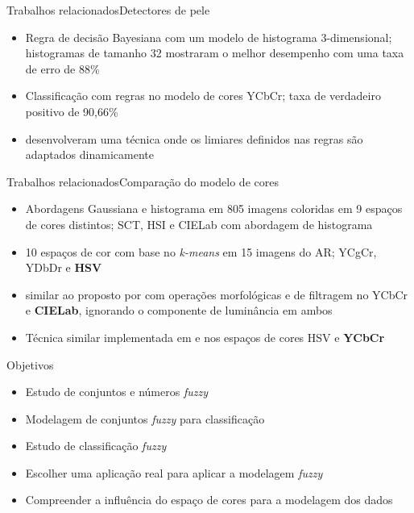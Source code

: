 \begin{frame}{Trabalhos relacionados}{Detectores de pele}
\begin{itemize}
    \item Regra de decisão Bayesiana com um modelo de histograma $3$-dimensional; histogramas de tamanho 32 mostraram o melhor desempenho com uma taxa de erro de 88\% \citep{jones:02}
    \item Classificação com regras no modelo de cores YCbCr; taxa de verdadeiro positivo de 90,66\% \citep{kovac:03}
    \item \citet{yogarajah:11} desenvolveram uma técnica onde os limiares definidos nas regras são adaptados dinamicamente
\end{itemize}
\end{frame}

\begin{frame}{Trabalhos relacionados}{Comparação do modelo de cores}
\begin{itemize}
    \item Abordagens Gaussiana e histograma em 805 imagens coloridas em 9 espaços de cores distintos; SCT, HSI e CIELab com abordagem de histograma \citep{jayaram:04}
    \item 10 espaços de cor com base no \emph{k-means} em 15 imagens do AR; YCgCr, YDbDr e \textbf{HSV} \citep{chaves:10}
    \item \citet{kaur:12} similar ao proposto por \citet{kovac:03} com operações morfológicas e de filtragem no YCbCr e \textbf{CIELab}, ignorando o componente de luminância em ambos
    \item Técnica similar implementada em \citet{shaik:15} e \citet{kumar:15} nos espaços de cores HSV e \textbf{YCbCr}
\end{itemize}
\end{frame}

\begin{frame}{Objetivos}
\begin{itemize}
    \item Estudo de conjuntos e números \emph{fuzzy}
    \item Modelagem de conjuntos \emph{fuzzy} para classificação
    \item Estudo de classificação \emph{fuzzy}
    \item Escolher uma aplicação real para aplicar a modelagem \emph{fuzzy}
    \item Compreender a influência do espaço de cores para a modelagem dos dados
\end{itemize}
\end{frame}
